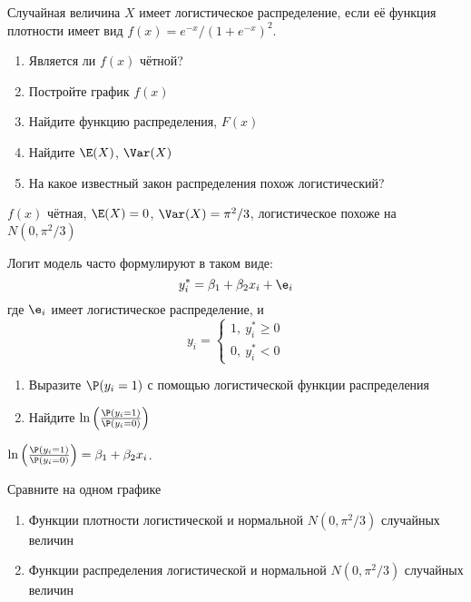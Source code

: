 \documentclass[pdftex,11pt,openany]{book}\usepackage[]{graphicx}\usepackage[]{color}
\begin{document}
\begin{problem}
Случайная величина $X$ имеет логистическое распределение, если её функция плотности имеет вид $f(x)=e^{-x}/(1+e^{-x})^2$.
\begin{enumerate}
\item Является ли $f(x)$ чётной?
\item Постройте график $f(x)$
\item Найдите функцию распределения, $F(x)$
\item Найдите $\E(X)$, $\Var(X)$
\item На какое известный закон распределения похож логистический?
\end{enumerate}
\end{problem}

\begin{solution}
$f(x)$ чётная, $\E(X)=0$, $\Var(X)=\pi^2/3$, логистическое похоже на $N(0,\pi^2/3)$
\end{solution}


\begin{problem}
Логит модель часто формулируют в таком виде:
\[
y_i^*=\beta_1+\beta_2 x_i +\e_i
\]
где $\e_i$ имеет логистическое распределение, и 
\[
y_i=\begin{cases}
1,\: y_i^*\geq 0 \\
0,\: y_i^*<0
\end{cases}
\]
\begin{enumerate}
\item Выразите $\P(y_i=1)$ с помощью логистической функции распределения 
\item Найдите $\ln \left(\frac{\P(y_i=1)}{\P(y_i=0)} \right)$
\end{enumerate}
\end{problem}

\begin{solution}
$\ln \left(\frac{\P(y_i=1)}{\P(y_i=0)} \right)=\beta_1+\beta_2 x_i$.
\end{solution}


\begin{problem}
\useR Сравните на одном графике
\begin{enumerate}
\item Функции плотности логистической и нормальной $N(0,\pi^2/3)$ случайных величин
\item Функции распределения логистической и нормальной $N(0,\pi^2/3)$ случайных величин
\end{enumerate}
\end{problem}
\begin{solution}
\end{solution}
\end{document}
